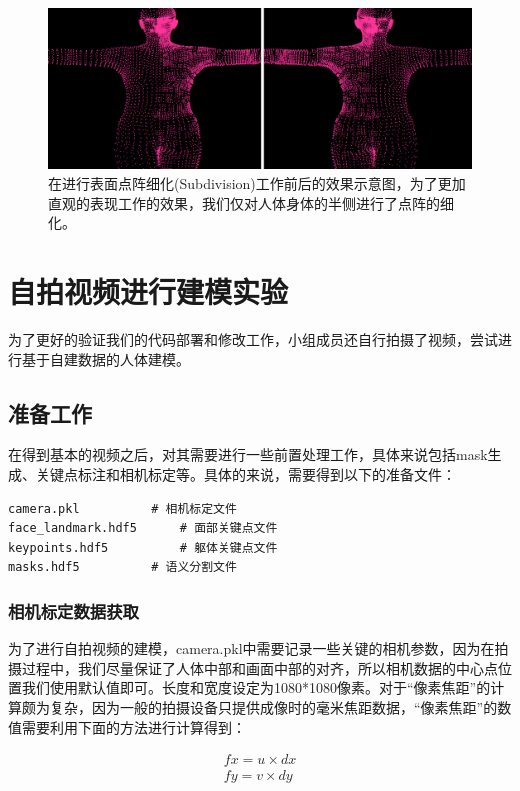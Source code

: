 \documentclass{article}
\begin{document}
\begin{figure}[H]
	\centering
	\includegraphics[width=16cm]{figure/subdivision}
	\caption{在进行表面点阵细化(Subdivision)工作前后的效果示意图，为了更加直观的表现工作的效果，我们仅对人体身体的半侧进行了点阵的细化。}
	\label{subdivision}
\end{figure}

\section{自拍视频进行建模实验}
为了更好的验证我们的代码部署和修改工作，小组成员还自行拍摄了视频，尝试进行基于自建数据的人体建模。

\subsection{准备工作}
在得到基本的视频之后，对其需要进行一些前置处理工作，具体来说包括mask生成、关键点标注和相机标定等。具体的来说，需要得到以下的准备文件：

\begin{lstlisting}
camera.pkl 			# 相机标定文件
face_landmark.hdf5		# 面部关键点文件
keypoints.hdf5			# 躯体关键点文件
masks.hdf5			# 语义分割文件
\end{lstlisting}

\subsubsection{相机标定数据获取}
为了进行自拍视频的建模，camera.pkl中需要记录一些关键的相机参数，因为在拍摄过程中，我们尽量保证了人体中部和画面中部的对齐，所以相机数据的中心点位置我们使用默认值即可。长度和宽度设定为1080*1080像素。对于“像素焦距”的计算颇为复杂，因为一般的拍摄设备只提供成像时的毫米焦距数据，“像素焦距”的数值需要利用下面的方法进行计算得到：

\begin{align}
	fx = u \times dx \\
	fy = v \times dy 
\end{align}
\end{document}
